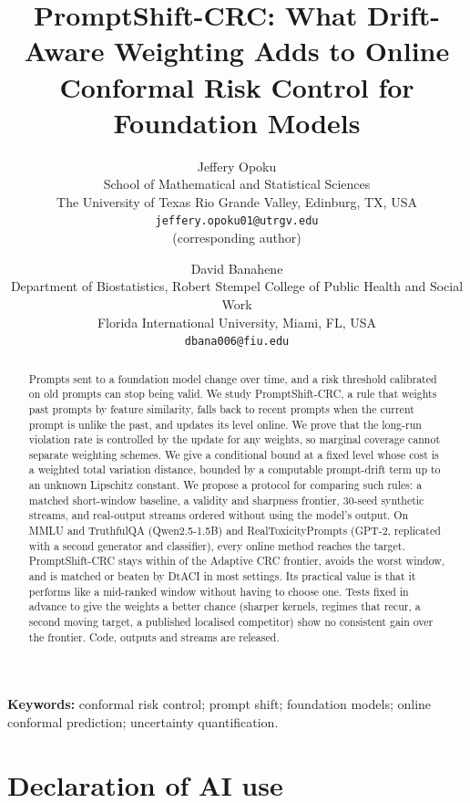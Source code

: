 \documentclass[11pt]{article}
\title{PromptShift-CRC: What Drift-Aware Weighting Adds to Online Conformal Risk Control for Foundation Models}
\author{
Jeffery Opoku\\
School of Mathematical and Statistical Sciences\\
The University of Texas Rio Grande Valley, Edinburg, TX, USA\\
\texttt{jeffery.opoku01@utrgv.edu}\\
(corresponding author)
\and
David Banahene\\
Department of Biostatistics, Robert Stempel College of Public Health and Social Work\\
Florida International University, Miami, FL, USA\\
\texttt{dbana006@fiu.edu}
}
\date{}
\begin{document}
\maketitle

\begin{abstract}
Prompts sent to a foundation model change over time, and a risk threshold calibrated on old prompts can stop being valid. We study PromptShift-CRC, a rule that weights past prompts by feature similarity, falls back to recent prompts when the current prompt is unlike the past, and updates its level online. We prove that the long-run violation rate is controlled by the update for any weights, so marginal coverage cannot separate weighting schemes. We give a conditional bound at a fixed level whose cost is a weighted total variation distance, bounded by a computable prompt-drift term up to an unknown Lipschitz constant. We propose a protocol for comparing such rules: a matched short-window baseline, a validity and sharpness frontier, 30-seed synthetic streams, and real-output streams ordered without using the model's output. On MMLU and TruthfulQA (Qwen2.5-1.5B) and RealToxicityPrompts (GPT-2, replicated with a second generator and classifier), every online method reaches the target. PromptShift-CRC stays within \PSfrontierMaxAbs{} of the Adaptive CRC frontier, avoids the worst window, and is matched or beaten by DtACI in most settings. Its practical value is that it performs like a mid-ranked window without having to choose one. Tests fixed in advance to give the weights a better chance (sharper kernels, regimes that recur, a second moving target, a published localised competitor) show no consistent gain over the frontier. Code, outputs and streams are released.
\end{abstract}

\noindent\textbf{Keywords:} conformal risk control; prompt shift; foundation models; online conformal prediction; uncertainty quantification.















\clearpage

\section*{Declaration of AI use}
\end{document}
